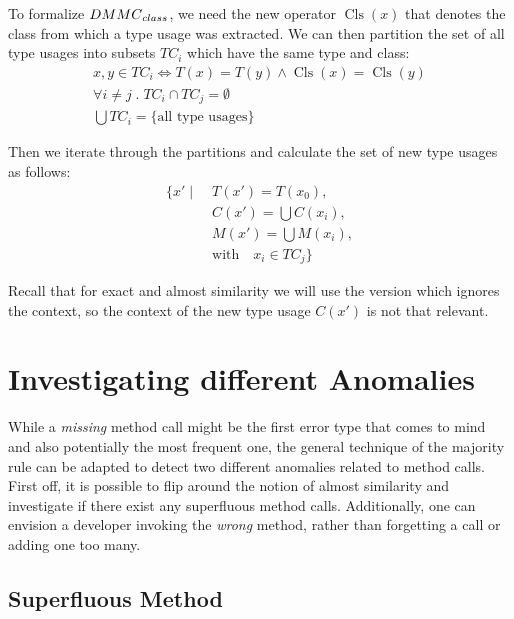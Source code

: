 To formalize $\mathnormal{DMMC}_{\mathnormal{class}}$, we need the new operator $\operatorname{Cls}(x)$ that denotes the class from which a type usage was extracted.
We can then partition the set of all type usages into subsets $TC_i$ which have the same type and class:
\begin{gather*}
    x, y \in TC_i \iff T(x) = T(y) \land \operatorname{Cls}(x) = \operatorname{Cls}(y) \\
    \forall i \ne j \;.\; TC_i \cap TC_j = \emptyset \\
    \bigcup TC_i = \{ \text{all type usages} \}
\end{gather*}

Then we iterate through the partitions and calculate the set of new type usages as follows:
\begin{align*}
    \{ x' \mid \;  & T(x') = T(x_0),\\
                & C(x') = \bigcup{C(x_i)},\\
                & M(x') = \bigcup{M(x_i)},\\
                & \text{with} \quad x_i \in TC_j \}
\end{align*}

Recall that for exact and almost similarity we will use the version which ignores the context, so the context of the new type usage $C(x')$ is not that relevant.

\section{Investigating different Anomalies}

While a \emph{missing} method call might be the first error type that comes to mind and also potentially the most frequent one, the general technique of the majority rule can be adapted to detect two different anomalies related to method calls.
First off, it is possible to flip around the notion of almost similarity and investigate if there exist any superfluous method calls.
Additionally, one can envision a developer invoking the \emph{wrong} method, rather than forgetting a call or adding one too many.


\subsection{Superfluous Method}

